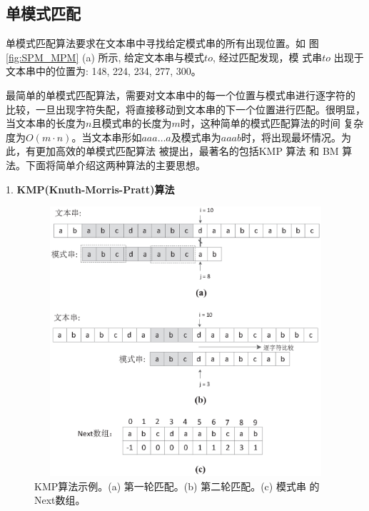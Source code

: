 \subsection{单模式匹配}

单模式匹配算法要求在文本串中寻找给定模式串的所有出现位置。如
图 \ref{fig:SPM_MPM} (a) 所示, 给定文本串与模式$to$, 经过匹配发现，模
式串$to$ 出现于文本串中的位置为: 148, 224, 234, 277, 300。

最简单的单模式匹配算法，需要对文本串中的每一个位置与模式串进行逐字符的
比较，一旦出现字符失配，将直接移动到文本串的下一个位置进行匹配。很明显，
当文本串的长度为$n$且模式串的长度为$m$时，这种简单的模式匹配算法的时间
复杂度为$O(m \cdot
n)$。当文本串形如$aaa \dots
a$及模式串为$aaab$时，将出现最坏情况。为此，有更加高效的单模式匹配算法
被提出，最著名的包括KMP \cite{Knuth1977}算法 和 BM \cite{Boyer1977} 算
法。下面将简单介绍这两种算法的主要思想。

1. \textbf{KMP(Knuth-Morris-Pratt)算法}

\begin{figure}[H]
  \centering
  \includegraphics[height=10cm ,width=12cm]{figures/1_Introduction/KMP.eps}
  \caption{KMP算法示例。(a) 第一轮匹配。(b) 第二轮匹配。(c) 模式串
    的Next数组。}
  \label{fig:KMP}
\end{figure}

